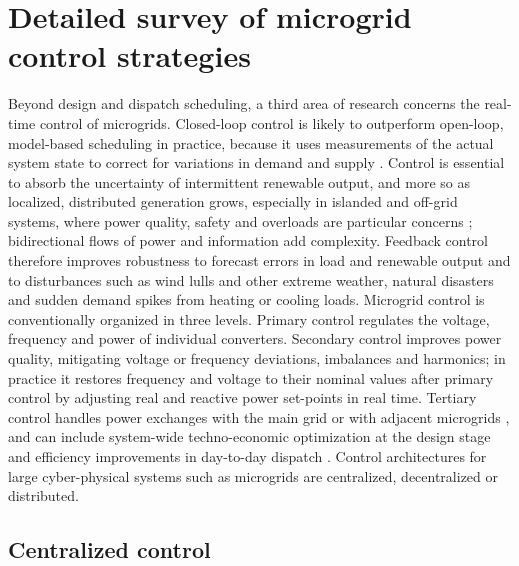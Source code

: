\documentclass[final,3p,times]{elsarticle}
\begin{document}
\section{Detailed survey of microgrid control strategies \label{app:control}}

Beyond design and dispatch scheduling, a third area of research concerns the real-time control of microgrids. Closed-loop control is likely to outperform open-loop, model-based scheduling in practice, because it uses measurements of the actual system state to correct for variations in demand and supply \cite{tazvinga2014}. Control is essential to absorb the uncertainty of intermittent renewable output, and more so as localized, distributed generation grows, especially in islanded and off-grid systems, where power quality, safety and overloads are particular concerns \cite{pourbabak2017}; bidirectional flows of power and information add complexity. Feedback control therefore improves robustness to forecast errors in load and renewable output and to disturbances such as wind lulls and other extreme weather, natural disasters and sudden demand spikes from heating or cooling loads. Microgrid control is conventionally organized in three levels. Primary control regulates the voltage, frequency and power of individual converters. Secondary control improves power quality, mitigating voltage or frequency deviations, imbalances and harmonics; in practice it restores frequency and voltage to their nominal values after primary control by adjusting real and reactive power set-points in real time. Tertiary control handles power exchanges with the main grid or with adjacent microgrids \cite{dragicevic_2017}, and can include system-wide techno-economic optimization at the design stage and efficiency improvements in day-to-day dispatch \cite{mg_review}. Control architectures for large cyber-physical systems such as microgrids are centralized, decentralized or distributed.

\subsection{Centralized control}
\end{document}
